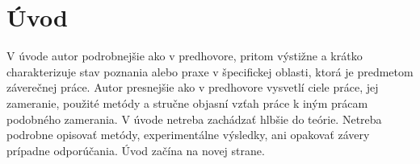 \chapter*{Úvod}

V úvode autor podrobnejšie ako v predhovore, pritom výstižne a krátko charakterizuje stav poznania alebo praxe v špecifickej oblasti, ktorá je predmetom záverečnej práce. Autor presnejšie ako v predhovore vysvetlí ciele práce, jej zameranie, použité metódy a stručne objasní vzťah práce k iným prácam podobného zamerania. V úvode netreba zachádzať hlbšie do teórie. Netreba podrobne opisovať metódy, experimentálne výsledky, ani opakovať závery prípadne odporúčania.
Úvod začína na novej  strane.